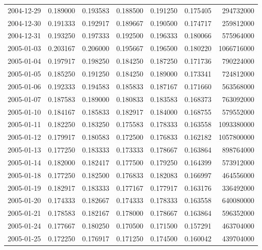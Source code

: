 \begin{tabular}{lrrrrrr}
2004-12-29 &    0.189000 &    0.193583 &    0.188500 &    0.191250 &    0.175405 &   294732000 \\
2004-12-30 &    0.191333 &    0.192917 &    0.189667 &    0.190500 &    0.174717 &   259812000 \\
2004-12-31 &    0.193250 &    0.197333 &    0.192500 &    0.196333 &    0.180066 &   575964000 \\
2005-01-03 &    0.203167 &    0.206000 &    0.195667 &    0.196500 &    0.180220 &  1066716000 \\
2005-01-04 &    0.197917 &    0.198250 &    0.184250 &    0.187250 &    0.171736 &   790224000 \\
2005-01-05 &    0.185250 &    0.191250 &    0.184250 &    0.189000 &    0.173341 &   724812000 \\
2005-01-06 &    0.192333 &    0.194583 &    0.185833 &    0.187167 &    0.171660 &   563568000 \\
2005-01-07 &    0.187583 &    0.189000 &    0.180833 &    0.183583 &    0.168373 &   763092000 \\
2005-01-10 &    0.184167 &    0.185833 &    0.182917 &    0.184000 &    0.168755 &   579552000 \\
2005-01-11 &    0.182250 &    0.183250 &    0.175583 &    0.178333 &    0.163558 &  1093380000 \\
2005-01-12 &    0.179917 &    0.180583 &    0.172500 &    0.176833 &    0.162182 &  1057800000 \\
2005-01-13 &    0.177250 &    0.183333 &    0.173333 &    0.178667 &    0.163864 &   898764000 \\
2005-01-14 &    0.182000 &    0.182417 &    0.177500 &    0.179250 &    0.164399 &   573912000 \\
2005-01-18 &    0.177250 &    0.182500 &    0.176833 &    0.182083 &    0.166997 &   464556000 \\
2005-01-19 &    0.182917 &    0.183333 &    0.177167 &    0.177917 &    0.163176 &   336492000 \\
2005-01-20 &    0.174333 &    0.182667 &    0.174333 &    0.178333 &    0.163558 &   640080000 \\
2005-01-21 &    0.178583 &    0.182167 &    0.178000 &    0.178667 &    0.163864 &   596352000 \\
2005-01-24 &    0.177667 &    0.180250 &    0.170500 &    0.171500 &    0.157291 &   463704000 \\
2005-01-25 &    0.172250 &    0.176917 &    0.171250 &    0.174500 &    0.160042 &   439704000 \\

\end{tabular}
